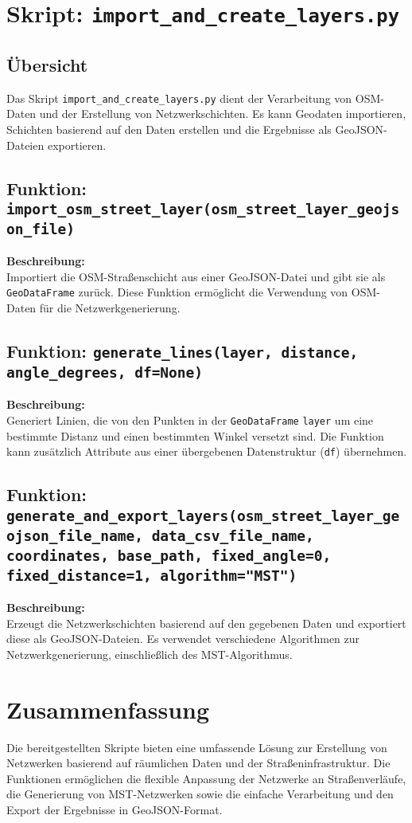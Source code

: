 \section{Skript: \texttt{import\_and\_create\_layers.py}}

\subsection{Übersicht}
Das Skript \texttt{import\_and\_create\_layers.py} dient der Verarbeitung von OSM-Daten und der Erstellung von Netzwerkschichten. Es kann Geodaten importieren, Schichten basierend auf den Daten erstellen und die Ergebnisse als GeoJSON-Dateien exportieren.

\subsection{Funktion: \texttt{import\_osm\_street\_layer(osm\_street\_layer\_geojson\_file)}}
\textbf{Beschreibung:}\\
Importiert die OSM-Straßenschicht aus einer GeoJSON-Datei und gibt sie als \texttt{GeoDataFrame} zurück. Diese Funktion ermöglicht die Verwendung von OSM-Daten für die Netzwerkgenerierung.

\subsection{Funktion: \texttt{generate\_lines(layer, distance, angle\_degrees, df=None)}}
\textbf{Beschreibung:}\\
Generiert Linien, die von den Punkten in der \texttt{GeoDataFrame} \texttt{layer} um eine bestimmte Distanz und einen bestimmten Winkel versetzt sind. Die Funktion kann zusätzlich Attribute aus einer übergebenen Datenstruktur (\texttt{df}) übernehmen.

\subsection{Funktion: \texttt{generate\_and\_export\_layers(osm\_street\_layer\_geojson\_file\_name, data\_csv\_file\_name, coordinates, base\_path, fixed\_angle=0, fixed\_distance=1, algorithm="MST")}}
\textbf{Beschreibung:}\\
Erzeugt die Netzwerkschichten basierend auf den gegebenen Daten und exportiert diese als GeoJSON-Dateien. Es verwendet verschiedene Algorithmen zur Netzwerkgenerierung, einschließlich des MST-Algorithmus.

\section{Zusammenfassung}
Die bereitgestellten Skripte bieten eine umfassende Lösung zur Erstellung von Netzwerken basierend auf räumlichen Daten und der Straßeninfrastruktur. Die Funktionen ermöglichen die flexible Anpassung der Netzwerke an Straßenverläufe, die Generierung von MST-Netzwerken sowie die einfache Verarbeitung und den Export der Ergebnisse in GeoJSON-Format.
